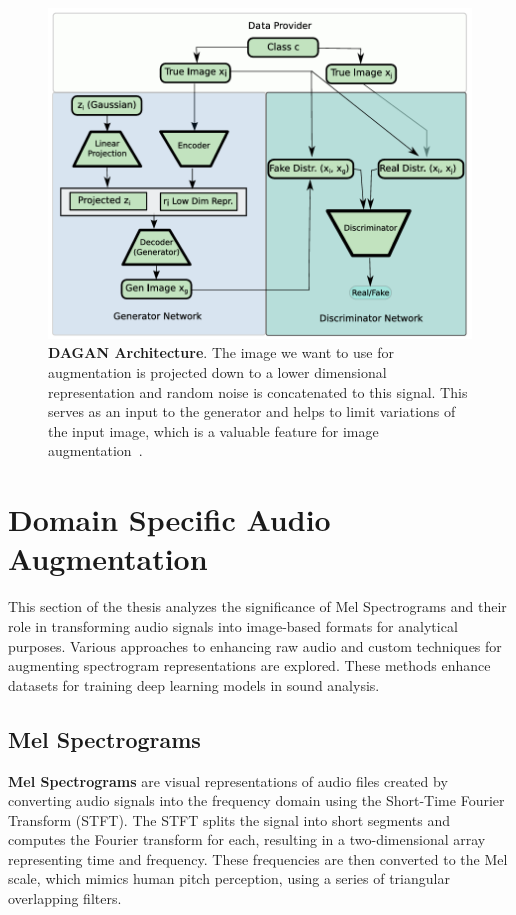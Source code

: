 \begin{figure}[!htb]
    \centering
    \includegraphics[scale=0.8]{Images/dagan-architecture.png}
    \caption{\textbf{DAGAN Architecture}. The image we want to use for augmentation is projected down to a lower dimensional representation and random noise is concatenated to this signal. This serves as an input to the generator and helps to limit variations of the input image, which is a valuable feature for image augmentation~\cite{DAGANPaper}.}
    \label{fig:DAGANArchitecture}
\end{figure}


\section{Domain Specific Audio Augmentation}
\label{ssec:domainSpecific}

This section of the thesis analyzes the significance of Mel Spectrograms and their role in transforming audio signals into image-based formats for analytical purposes. Various approaches to enhancing raw audio and custom techniques for augmenting spectrogram representations are explored. These methods enhance datasets for training deep learning models in sound analysis.

\subsection{Mel Spectrograms}
\textbf{Mel Spectrograms} are visual representations of audio files created by converting audio signals into the frequency domain using the Short-Time Fourier Transform (STFT). The STFT splits the signal into short segments and computes the Fourier transform for each, resulting in a two-dimensional array representing time and frequency. These frequencies are then converted to the Mel scale, which mimics human pitch perception, using a series of triangular overlapping filters.

